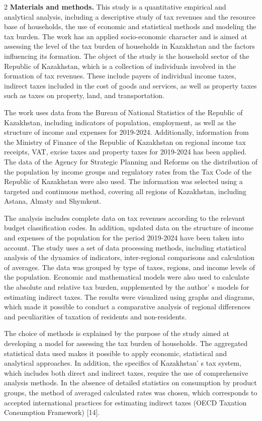 \begin{multicols}{2}
{\bfseries Materials and methods.} This study is a quantitative empirical
and analytical analysis, including a descriptive study of tax revenues
and the resource base of households, the use of economic and statistical
methods and modeling the tax burden. The work has an applied
socio-economic character and is aimed at assessing the level of the tax
burden of households in Kazakhstan and the factors influencing its
formation. The object of the study is the household sector of the
Republic of Kazakhstan, which is a collection of individuals involved in
the formation of tax revenues. These include payers of individual income
taxes, indirect taxes included in the cost of goods and services, as
well as property taxes such as taxes on property, land, and
transportation.

The work uses data from the Bureau of National Statistics of the
Republic of Kazakhstan, including indicators of population, employment,
as well as the structure of income and expenses for 2019-2024.
Additionally, information from the Ministry of Finance of the Republic
of Kazakhstan on regional income tax receipts, VAT, excise taxes and
property taxes for 2019-2024 has been applied. The data of the Agency
for Strategic Planning and Reforms on the distribution of the population
by income groups and regulatory rates from the Tax Code of the Republic
of Kazakhstan were also used. The information was selected using a
targeted and continuous method, covering all regions of Kazakhstan,
including Astana, Almaty and Shymkent.

The analysis includes complete data on tax revenues according to the
relevant budget classification codes. In addition, updated data on the
structure of income and expenses of the population for the period
2019-2024 have been taken into account. The study uses a set of data
processing methods, including statistical analysis of the dynamics of
indicators, inter-regional comparisons and calculation of averages. The
data was grouped by type of taxes, regions, and income levels of the
population. Economic and mathematical models were also used to calculate
the absolute and relative tax burden, supplemented by the
author' s models for estimating indirect taxes. The
results were visualized using graphs and diagrams, which made it
possible to conduct a comparative analysis of regional differences and
peculiarities of taxation of residents and non-residents.

The choice of methods is explained by the purpose of the study aimed at
developing a model for assessing the tax burden of households. The
aggregated statistical data used makes it possible to apply economic,
statistical and analytical approaches. In addition, the specifics of
Kazakhstan' s tax system, which includes both direct and
indirect taxes, require the use of comprehensive analysis methods. In
the absence of detailed statistics on consumption by product groups, the
method of averaged calculated rates was chosen, which corresponds to
accepted international practices for estimating indirect taxes (OECD
Taxation Consumption Framework) {[}14{]}.


\end{multicols}
